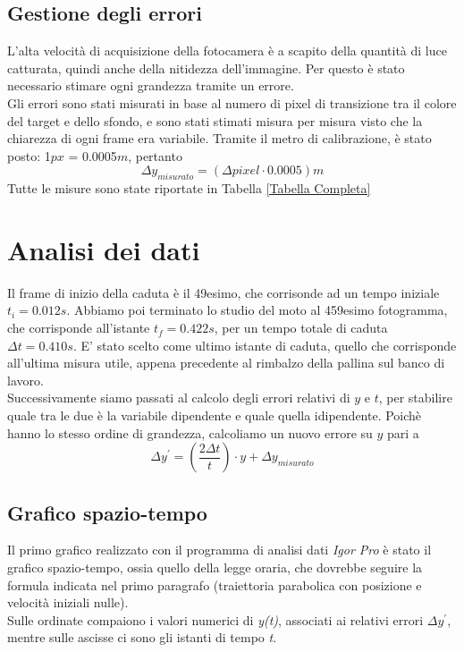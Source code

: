 \documentclass[12pt, a4paper]{article}
\begin{document}
\subsection{Gestione degli errori}
L'alta velocità di acquisizione della fotocamera è a scapito della quantità di luce catturata, quindi anche della nitidezza dell'immagine. Per questo è stato necessario stimare ogni grandezza tramite un errore. \\
Gli errori sono stati misurati in base al numero di pixel di transizione tra il colore del target e dello sfondo, e sono stati stimati misura per misura visto che la chiarezza di ogni frame era variabile. Tramite il metro di calibrazione, è stato posto: 1$px$ = 0.0005$m$, pertanto
\begin{equation*}
    \Delta y_{misurato}= (\Delta pixel \cdot 0.0005)m
\end{equation*}
\bigskip
Tutte le misure sono state riportate in Tabella \ref{Tabella Completa}

\section{Analisi dei dati}
Il frame di inizio della caduta è il 49esimo, che corrisonde ad un tempo iniziale \textit{$t_i = 0.012s$}.
Abbiamo poi terminato lo studio del moto al 459esimo fotogramma, che corrisponde all'istante \textit{$t_f = 0.422s$}, per un tempo totale di caduta \textit{$\Delta t = 0.410s$}. 
E' stato scelto come ultimo istante di caduta, quello che corrisponde all'ultima misura utile, appena precedente al rimbalzo della pallina sul banco di lavoro.\\

Successivamente siamo passati al calcolo degli errori relativi di $y$ e $t$, per stabilire quale tra le due è la variabile dipendente e quale quella idipendente. Poichè hanno lo stesso ordine di grandezza, calcoliamo un nuovo errore su $y$ pari a 
\begin{equation*}
   \Delta y^{'} = (\frac{2\Delta t}{t})\cdot y + \Delta y_{misurato}
\end{equation*}
\subsection{Grafico spazio-tempo}
Il primo grafico realizzato con il programma di analisi dati \textit{Igor Pro} è stato il grafico spazio-tempo, ossia quello della legge oraria, che dovrebbe seguire la formula indicata nel primo paragrafo (traiettoria parabolica con posizione e velocità iniziali nulle).\\ 
Sulle ordinate compaiono i valori numerici di \textit{y(t)}, associati ai relativi errori  \textit{$\Delta y^{'}$}, mentre sulle ascisse ci sono gli istanti di tempo \textit{t}. 
\end{document}
